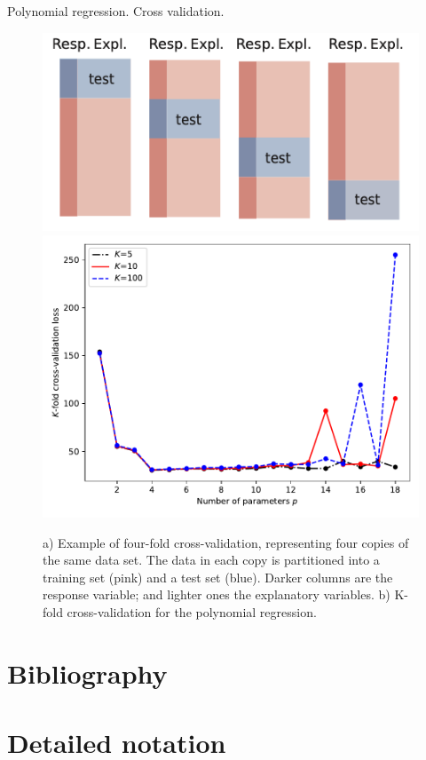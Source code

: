 \documentclass{beamer}
\begin{document}
\begin{frame}{Polynomial regression. Cross validation.}
  \begin{figure}
    \includegraphics[width=0.4\linewidth]{crossval}
    \includegraphics[width=0.4\linewidth]{crossvalpy}
    \label{fig:crossvalpy}
    \caption{a) Example of four-fold cross-validation, representing four copies of the same data set. The data in each copy is partitioned into a training set (pink) and a test set (blue).  Darker columns are the response variable; and lighter ones the explanatory variables. b) K-fold cross-validation for the polynomial regression\cite{kroese2020}.}
  \end{figure}
\end{frame}

\section{Bibliography}



\section{Detailed notation}
\end{document}
